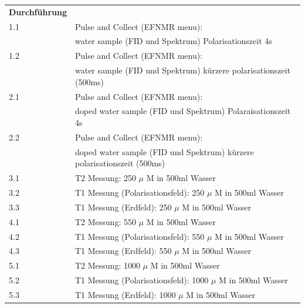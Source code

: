 
\vspace{0.5cm}


 \begin{tabular}{ll}   
    \textbf{Durchführung} & \\
           1.1 & Pulse and Collect (EFNMR menu): \\
           & water sample (FID und Spektrum) Polarisationszeit 4s \\
    
           1.2 & Pulse and Collect (EFNMR menu): \\
           & water sample (FID und Spektrum) kürzere polarisationszeit (500ms) \\
    
           2.1 & Pulse and Collect (EFNMR menu): \\
           & doped water sample (FID und Spektrum) Polaraisationszeit 4s \\
    
           2.2 & Pulse and Collect (EFNMR menu): \\
           &doped water sample (FID und Spektrum) kürzere polarisationszeit (500ms) \\
    
           3.1 & T2 Messung: 250 $\mu$ M in 500ml Wasser \\
    
           3.2 & T1 Messung (Polarisationsfeld): 250 $\mu$ M in 500ml Wasser \\
    
           3.3 & T1 Messung (Erdfeld): 250 $\mu$ M in 500ml Wasser \\
    
           4.1 & T2 Messung: 550 $\mu$ M in 500ml Wasser \\
    
           4.2 & T1 Messung (Polarisationsfeld): 550 $\mu$ M in 500ml Wasser \\
    
           4.3 & T1 Messung (Erdfeld): 550 $\mu$ M in 500ml Wasser \\
    
           5.1 & T2 Messung: 1000 $\mu$ M in 500ml Wasser \\
    
           5.2 & T1 Messung (Polarisationsfeld): 1000 $\mu$ M in 500ml Wasser \\
    
           5.3 & T1 Messung (Erdfeld): 1000 $\mu$ M in 500ml Wasser \\
    

\end{tabular}
